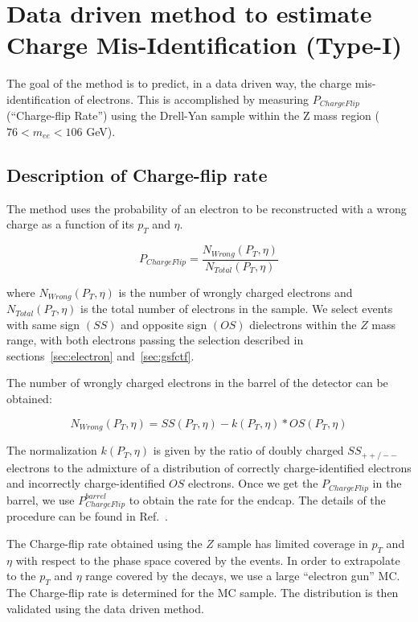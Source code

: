 \section{Data driven method to estimate Charge Mis-Identification (Type-I)}
\label{sec:chargemisid}

The goal of the method is to predict, in a data driven way, the charge 
mis-identification of electrons. This is accomplished
by measuring $P_{ChargeFlip}$ (``Charge-flip Rate'') using the Drell-Yan sample within the Z mass region
($76 < m_{ee} < 106 $ GeV). 

\subsection{Description of Charge-flip rate}

The method uses the probability of an electron to be reconstructed 
with a wrong charge as a function of its $p_T$ and $\eta$.

\begin{equation}
P_{ChargeFlip} = \frac{N_{Wrong}(P_T, \eta)}{N_{Total}(P_T, \eta)}
\end{equation}

where $N_{Wrong}(P_T, \eta)$ is the number of wrongly charged electrons  and $N_{Total}(P_T, \eta)$ is 
the total number of electrons in the sample. We select events with same sign $(SS)$ 
and opposite sign $(OS)$ dielectrons within the $Z$ mass range, with both electrons passing the 
selection described in sections~\ref{sec:electron} and~\ref{sec:gsfctf}. 

The number of wrongly charged electrons in the barrel of the detector can be obtained:

\begin{equation}
  N_{Wrong}(P_T, \eta) = SS(P_T, \eta) - k(P_T, \eta) * OS(P_T, \eta) 
\end{equation}

The normalization $k(P_T, \eta)$ is given by the ratio of doubly charged $SS_{++/--}$ electrons to the 
admixture of a distribution of correctly charge-identified electrons and incorrectly charge-identified 
$OS$ electrons. Once we get the $P_{ChargeFlip}$ in the barrel, we use 
$P^{barrel}_{ChargeFlip}$ to obtain the rate for the endcap. The details of the procedure can be found
in Ref.~\cite{chargefake}.


The Charge-flip rate obtained using the $Z$ sample has limited coverage in $p_T$ and $\eta$ with respect
to the phase space covered by the \ttbar events. In order to extrapolate to the $p_T$ and $\eta$ 
range covered by the \ttbar decays, we use a large ``electron gun'' MC. The Charge-flip rate is determined 
for the MC sample. The distribution is then validated using the data driven method.

